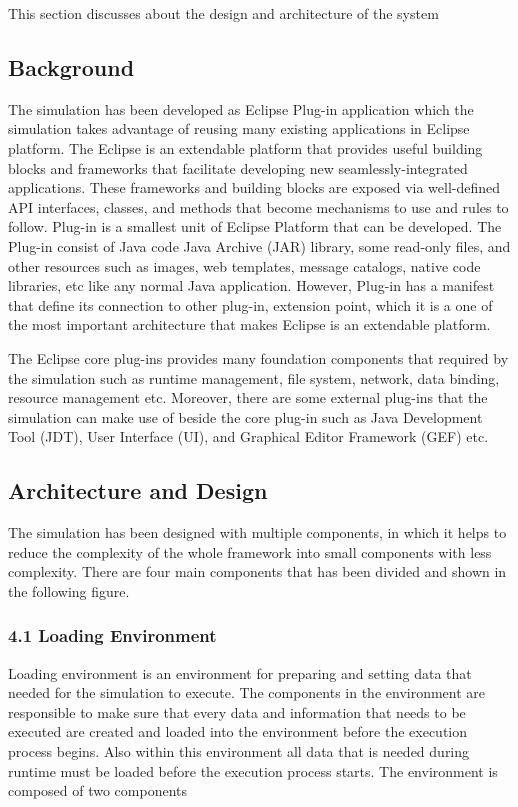 
This section discusses about the design and architecture of the system

\subsection{Background}

The simulation has been developed as Eclipse Plug-in application which the simulation takes advantage of reusing many existing applications in Eclipse platform. The Eclipse is an extendable platform that provides useful building blocks and frameworks that facilitate developing new seamlessly-integrated applications. These frameworks and building blocks are exposed via well-defined API interfaces, classes, and methods that become mechanisms to use and rules to follow. Plug-in is a smallest unit of Eclipse Platform that can be developed. The Plug-in consist of Java code Java Archive (JAR) library, some read-only files, and other resources such as images, web templates, message catalogs, native code libraries, etc like any normal Java application. However, Plug-in has a manifest that define its connection to other plug-in, extension point, which it is a one of the most important architecture that  makes Eclipse is an extendable platform.

The Eclipse core plug-ins provides many foundation components that required by the simulation such as runtime management, file system, network, data binding, resource management etc. Moreover, there are some external plug-ins that the simulation can make use of beside the core plug-in such as Java Development Tool (JDT), User Interface (UI), and Graphical Editor Framework (GEF) etc.

\subsection{Architecture and Design}

The simulation has been designed with multiple components, in which it helps to reduce the complexity of the whole framework into small components with less complexity. There are four main components that has been divided and shown in the following figure.


\subsubsection{4.1 Loading Environment}

Loading environment is an environment for preparing and setting data that needed for the simulation to execute. The components in the environment are responsible to make sure that every data and information that needs to be executed are created and loaded into the environment before the execution process begins. Also within this environment all data that is needed during runtime must be loaded before the execution process starts. The environment is composed of two components


